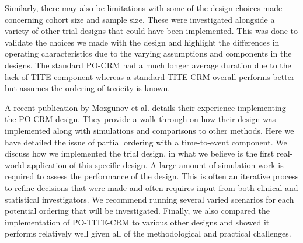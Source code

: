 Similarly, there may also be limitations with some of the design choices made concerning cohort size and sample size. These were investigated alongside a variety of other trial designs that could have been implemented. This was done to validate the choices we made with the design and highlight the differences in operating characteristics due to the varying assumptions and components in the designs. The standard PO-CRM had a much longer average duration due to the lack of TITE component whereas a standard TITE-CRM overall performs better but assumes the ordering of toxicity is known. 

A recent publication by Mozgunov et al. \cite{mozgunovPracticalImplementationPartial2022} details their experience implementing the PO-CRM design. They provide a walk-through on how their design was implemented along with simulations and comparisons to other methods. Here we have detailed the issue of partial ordering with a time-to-event component. We discuss how we implemented the trial design, in what we believe is the first real-world application of this specific design. A large amount of simulation work is required to assess the performance of the design. This is often an iterative process to refine decisions that were made and often requires input from both clinical and statistical investigators. We recommend running several varied scenarios for each potential ordering that will be investigated. Finally, we also compared the implementation of PO-TITE-CRM to various other designs and showed it performs relatively well given all of the methodological and practical challenges. 

